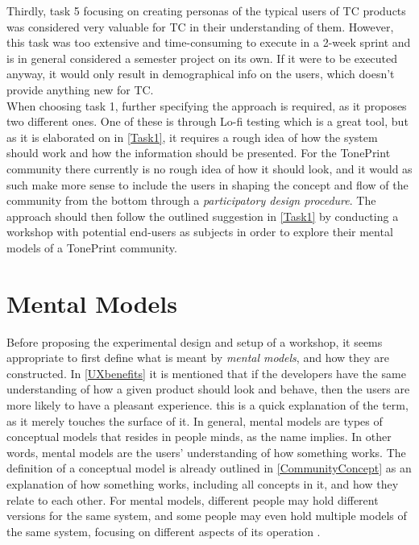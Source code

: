 Thirdly, task 5 focusing on creating personas of the typical users of TC products was considered very valuable for TC in their understanding of them. However, this task was too extensive and time-consuming to execute in a 2-week sprint and is in general considered a semester project on its own. If it were to be executed anyway, it would only result in demographical info on the users, which doesn't provide anything new for TC.\\

\noindent
When choosing task 1, further specifying the approach is required, as it proposes two different ones. One of these is through Lo-fi testing which is a great tool, but as it is elaborated on in \autoref{Task1}, it requires a rough idea of how the system should work and how the information should be presented. For the TonePrint community there currently is no rough idea of how it should look, and it would as such make more sense to include the users in shaping the concept and flow of the community from the bottom through a \textit{participatory design procedure}. The approach should then follow the outlined suggestion in \autoref{Task1} by conducting a workshop with potential end-users as subjects in order to explore their mental models of a TonePrint community.

\section{Mental Models}
\label{MentalModel}
Before proposing the experimental design and setup of a workshop, it seems appropriate to first define what is meant by \textit{mental models}, and how they are constructed. In \autoref{UXbenefits} it is mentioned that if the developers have the same understanding of how a given product should look and behave, then the users are more likely to have a pleasant experience. this is a quick explanation of the term, as it merely touches the surface of it. In general, mental models are types of conceptual models that resides in people minds, as the name implies. In other words, mental models are the users' understanding of how something works. The definition of a conceptual model is already outlined in \autoref{CommunityConcept} as an explanation of how something works, including all concepts in it, and how they relate to each other. For mental models, different people may hold different versions for the same system, and some people may even hold multiple models of the same system, focusing on different aspects of its operation \parencite[][26]{PDF:DonNorman}.  


